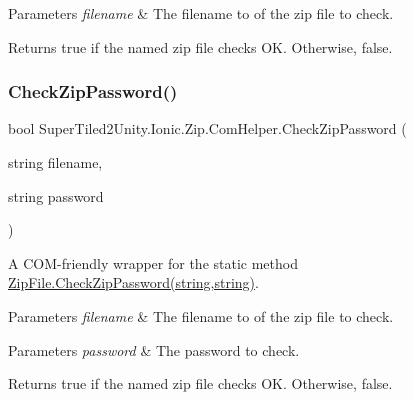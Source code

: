 \begin{DoxyParams}{Parameters}
{\em filename} & The filename to of the zip file to check.\\
\hline
\end{DoxyParams}


\begin{DoxyReturn}{Returns}
true if the named zip file checks OK. Otherwise, false. 
\end{DoxyReturn}
\mbox{\label{class_super_tiled2_unity_1_1_ionic_1_1_zip_1_1_com_helper_ab7c2eb9534a0834b97b072fd37843d72}} 
\subsubsection{\texorpdfstring{Check\+Zip\+Password()}{CheckZipPassword()}}
{\footnotesize\ttfamily bool Super\+Tiled2\+Unity.\+Ionic.\+Zip.\+Com\+Helper.\+Check\+Zip\+Password (\begin{DoxyParamCaption}\item[{string}]{filename,  }\item[{string}]{password }\end{DoxyParamCaption})}



A C\+O\+M-\/friendly wrapper for the static method \mbox{\hyperlink{class_super_tiled2_unity_1_1_ionic_1_1_zip_1_1_zip_file_abb1bba30c02b71822a1053fa5f4a8204}{Zip\+File.\+Check\+Zip\+Password(string,string)}}. 


\begin{DoxyParams}{Parameters}
{\em filename} & The filename to of the zip file to check.\\
\hline
\end{DoxyParams}



\begin{DoxyParams}{Parameters}
{\em password} & The password to check.\\
\hline
\end{DoxyParams}


\begin{DoxyReturn}{Returns}
true if the named zip file checks OK. Otherwise, false. 
\end{DoxyReturn}
\mbox{\label{class_super_tiled2_unity_1_1_ionic_1_1_zip_1_1_com_helper_aa9fc5f24fa17974fdfa2b9e76ce4442e}} 
